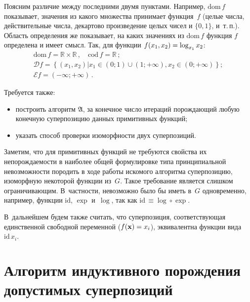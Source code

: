 \begin{multicols}{2}
Поясним различие между последними двумя пунктами. Например, $\text{dom}\, f$
показывает, значения из какого множества принимает функция~$f$ (целые чис\-ла,
действительные чис\-ла, декартово произведение целых чи\-сел и $\{0, 1\}$,
и~т.\,п.). Область определения же показывает, на каких значениях из
$\text{dom}\, f$ функция $f$ определена и имеет смысл. Так, для функции
$f(x_1, x_2) \hm= \log_{x_1} x_2$:
\begin{gather*}
  \text{dom}\, f = \mathbb{R} \times \mathbb{R}\,,\quad 
  \text{cod}\, f = \mathbb{R}\,;
\\
  \mathcal{D} f = \left\{ (x_1, x_2) \vert x_1 \in (0; 1) \cup (1; +\infty), x_2 \in (0; +\infty) \right\};
\\
  \mathcal{E} f = (-\infty; +\infty)\,.
\end{gather*}

Требуется также:
\begin{itemize}
  \item построить алгоритм $\mathfrak{A}$, за конечное число итераций
    порождающий любую конечную суперпозицию данных примитивных функций;
  \item указать способ проверки изоморфности двух суперпозиций.
\end{itemize}

Заметим, что для примитивных функций  не требуются свойства их непорождаемости
в наиболее общей формулировке типа принципиальной невозможности породить
в ходе работы искомого алгоритма суперпозицию, изоморфную некоторой функции из~$G$. 
Такое требование является слишком ограничивающим. В~частности, невозможно
было бы иметь в~$G$ одновременно, например, функции $\text{id}$, $\exp$
и~$\log$, так как $\text{id}\,\equiv \log \circ \exp$.

В~дальнейшем будем также считать, что суперпозиция, соответствующая
единственной свободной переменной ($f(\mathbf{x}) \hm= x_i$), эквивалентна
функции вида $\text{id}\,x_i$.

\section{Алгоритм индуктивного порождения допустимых суперпозиций}


\end{multicols}
